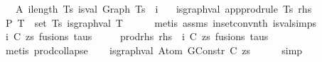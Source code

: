 \begin{isabellebody}
\ \ \ A{}{\isacharcolon}{\kern0pt}\ {\isachardoublequoteopen}{\isasymforall}i{\isacharless}{\kern0pt}length\ Ts{\isachardot}{\kern0pt}\ is{\isacharunderscore}{\kern0pt}val\ {\isacharparenleft}{\kern0pt}Graph\ {\isacharparenleft}{\kern0pt}Ts\ {\isacharbang}{\kern0pt}\ i{\isacharparenright}{\kern0pt}{\isacharparenright}{\kern0pt}{\isachardoublequoteclose}\isanewline
\ \ \ {\isachardoublequoteopen}is{\isacharunderscore}{\kern0pt}graph{\isacharunderscore}{\kern0pt}val\ {\isacharparenleft}{\kern0pt}app{\isacharunderscore}{\kern0pt}prodrule\ Ts\ rhs{\isacharparenright}{\kern0pt}{\isachardoublequoteclose}\isanewline
%
\isadelimproof
%
\endisadelimproof
%
\isatagproof
{}\isamarkupfalse%
\ {\isacharminus}{\kern0pt}\isanewline
\ \ \isamarkupfalse%
\ P{}{\isacharcolon}{\kern0pt}\ {\isachardoublequoteopen}{\isasymforall}T\ {\isasymin}\ set\ Ts{\isachardot}{\kern0pt}\ is{\isacharunderscore}{\kern0pt}graph{\isacharunderscore}{\kern0pt}val\ T{\isachardoublequoteclose}\isanewline
\ \ \ \ \isamarkupfalse%
\ {\isacharparenleft}{\kern0pt}metis\ assms\ in{\isacharunderscore}{\kern0pt}set{\isacharunderscore}{\kern0pt}conv{\isacharunderscore}{\kern0pt}nth\ is{\isacharunderscore}{\kern0pt}val{\isachardot}{\kern0pt}simps{\isacharparenleft}{\kern0pt}{}{\isacharparenright}{\kern0pt}{\isacharparenright}{\kern0pt}\isanewline
\isanewline
\ \ \isamarkupfalse%
\ i\ C\ zs\ fusions\ taus\ \isanewline
\ \ \ \ prod{\isacharunderscore}{\kern0pt}rhs{\isacharcolon}{\kern0pt}\ {\isachardoublequoteopen}rhs\ {\isacharequal}{\kern0pt}\ {\isacharparenleft}{\kern0pt}i{\isacharcomma}{\kern0pt}\ {\isacharparenleft}{\kern0pt}C{\isacharcomma}{\kern0pt}\ zs{\isacharparenright}{\kern0pt}{\isacharcomma}{\kern0pt}\ fusions{\isacharcomma}{\kern0pt}\ taus{\isacharparenright}{\kern0pt}{\isachardoublequoteclose}\isanewline
\ \ \isamarkupfalse%
\ {\isacharparenleft}{\kern0pt}metis\ prod{\isachardot}{\kern0pt}collapse{\isacharparenright}{\kern0pt}\isanewline
\isanewline
\ \ \isamarkupfalse%
\ {\isachardoublequoteopen}is{\isacharunderscore}{\kern0pt}graph{\isacharunderscore}{\kern0pt}val\ {\isacharparenleft}{\kern0pt}Atom\ {\isacharparenleft}{\kern0pt}GConstr\ C{\isacharparenright}{\kern0pt}\ zs{\isacharparenright}{\kern0pt}{\isachardoublequoteclose}\isanewline
\ \ \ \ \isamarkupfalse%
\ simp\isanewline
\isanewline
\ \ \isamarkupfalse%
\ \isamarkupfalse%

\end{isabellebody}
